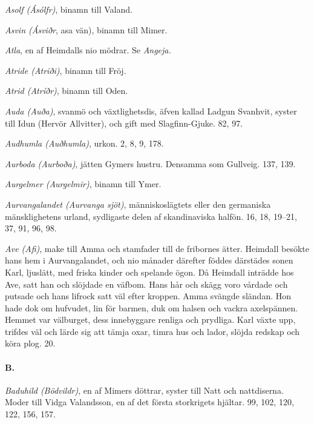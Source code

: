 \protect\hypertarget{lb1625905.xhtmlux5cux23start204}{}{}\protect\hypertarget{lb1625905.xhtmlux5cux23start204-a}{}{}\protect\hypertarget{lb1625905.xhtmlux5cux23start204-b}{}{}\protect\hypertarget{lb1625905.xhtmlux5cux23start204-c}{}{}\protect\hypertarget{lb1625905.xhtmlux5cux23start204-d}{}{}

\emph{Asolf (Ásólfr)}, binamn till Valand.

\emph{Asvin (Ásviðr}, asa vän), binamn till Mimer.

\emph{Atla}, en af Heimdalls nio mödrar. Se \emph{Angeja.}

\emph{Atride (Atriði)}, binamn till Fröj.

\emph{Atrid (Atríðr)}, binamn till Oden.

\emph{Auda (Auða)}, svanmö och växtlighetsdis, äfven kallad Ladgun
Svanhvit, syster till Idun (Hervör Allvitter), och gift med
Slagfinn-Gjuke. 82, 97.

\emph{Audhumla (Auðhumla)}, urkon. 2, 8, 9, 178.

\emph{Aurboda (Aurboða)}, jätten Gymers hustru. Densamma som Gullveig.
137, 139.

\emph{Aurgelmer (Aurgelmir)}, binamn till Ymer.

\emph{Aurvangalandet (Aurvanga sjöt)}, människoslägtets eller den
germaniska mänsklighetens urland, sydligaste delen af skandinaviska
halfön. 16, 18, 19--21, 37, 91, 96, 98.

\emph{Ave (Afi)}, make till Amma och stamfader till de fribornes ätter.
Heimdall besökte hans hem i Aurvangalandet, och nio månader därefter
föddes därstädes sonen Karl, ljuslätt, med friska kinder och spelande
ögon. Då Heimdall inträdde hos Ave, satt han och slöjdade en väfbom.
Hans hår och skägg voro vårdade och putsade och hans lifrock satt väl
efter kroppen. Amma svängde sländan. Hon hade dok om hufvudet, lin för
barmen, duk om halsen och vackra axelspännen. Hemmet var välburget, dess
innebyggare renliga och prydliga. Karl växte upp, trifdes väl och lärde
sig att tämja oxar, timra hus och lador, slöjda redskap och köra plog.
20.

\paragraph{B.}

\emph{Baduhild (Bödvildr)}, en af Mimers döttrar, syster till Natt och
nattdiserna. Moder till Vidga Valandsson, en af det första storkrigets
hjältar. 99, 102, 120, 122, 156, 157.

